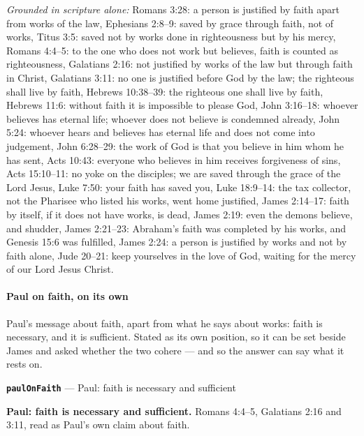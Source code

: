\documentclass[11pt]{article}
\begin{document}
\emph{Grounded in scripture alone:} Romans 3:28: a person is justified by faith apart from works of the law, Ephesians 2:8–9: saved by grace through faith, not of works, Titus 3:5: saved not by works done in righteousness but by his mercy, Romans 4:4–5: to the one who does not work but believes, faith is counted as righteousness, Galatians 2:16: not justified by works of the law but through faith in Christ, Galatians 3:11: no one is justified before God by the law; the righteous shall live by faith, Hebrews 10:38–39: the righteous one shall live by faith, Hebrews 11:6: without faith it is impossible to please God, John 3:16–18: whoever believes has eternal life; whoever does not believe is condemned already, John 5:24: whoever hears and believes has eternal life and does not come into judgement, John 6:28–29: the work of God is that you believe in him whom he has sent, Acts 10:43: everyone who believes in him receives forgiveness of sins, Acts 15:10–11: no yoke on the disciples; we are saved through the grace of the Lord Jesus, Luke 7:50: your faith has saved you, Luke 18:9–14: the tax collector, not the Pharisee who listed his works, went home justified, James 2:14–17: faith by itself, if it does not have works, is dead, James 2:19: even the demons believe, and shudder, James 2:21–23: Abraham's faith was completed by his works, and Genesis 15:6 was fulfilled, James 2:24: a person is justified by works and not by faith alone, Jude 20–21: keep yourselves in the love of God, waiting for the mercy of our Lord Jesus Christ.
\paragraph*{Paul on faith, on its own}
\leavevmode\par
Paul's message about faith, apart from what he says about works: faith is necessary, and it is sufficient. Stated as its own position, so it can be set beside James and asked whether the two cohere — and so the answer can say what it rests on.

\par\medskip\noindent\textbf{\texttt{paul\allowbreak{}On\allowbreak{}Faith}} --- Paul: faith is necessary and sufficient\par\nobreak\noindent
\textbf{Paul: faith is necessary and sufficient.} Romans 4:4–5, Galatians 2:16 and 3:11, read as Paul's own claim about faith.
\end{document}
